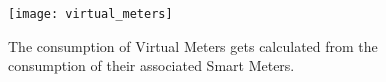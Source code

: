 \begin{figure}[htb]
    \centering
    \texttt{[image: virtual\_meters]}
    \caption{The consumption of Virtual Meters gets calculated from the consumption of their associated Smart Meters.}
    \label{fig:virtual_meters_consumption}
\end{figure}